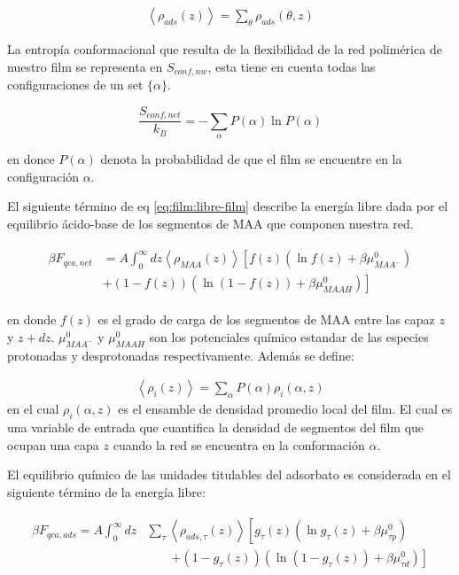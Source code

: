 \begin{align}
	\left<\rho_{ads}(z)\right> = \sum_\theta{\rho_{ads}(\theta,z)}
\end{align}


La entrop\'ia conformacional que resulta de la flexibilidad de la red polim\'erica de nuestro film se representa en $S_{conf, nw}$, esta tiene en cuenta todas las configuraciones de un set $\{\alpha\}$.

\begin{equation}
	\frac{S_{conf,net}}{k_B} = - \sum_{\alpha}{P(\alpha)\ln P(\alpha)}
\end{equation}

\noindent en donce $P(\alpha)$ denota la probabilidad de que el film se encuentre en la configuraci\'on $\alpha$.

El siguiente t\'ermino de eq \ref{eq:film:libre-film} describe  la energ\'ia libre dada por  el equilibrio \'acido-base de los segmentos de MAA que componen nuestra red. 

\begin{align}
	\begin{aligned}
		\beta F_{qca,net} &= A\int_0^\infty dz \left<\rho_{MAA}(z)\right> \left[f(z)(\ln f(z)+ \beta\mu^0_{MAA^-})\right.\\
		&\left.+(1-f(z))(\ln (1-f(z))+\beta\mu^0_{MAAH})\right]    
	\end{aligned}
\end{align} 

\noindent en donde $f(z)$ es el grado de carga de los segmentos de MAA entre las capaz $z$ y $z + dz$. 
$\mu^0_{MAA^-}$ y $\mu^0_{MAAH}$ son los potenciales qu\'imico estandar  de las especies protonadas y desprotonadas respectivamente.
Adem\'as se define:

\begin{align}
	\left< \rho_i(z)\right> = \sum_\alpha{P(\alpha)\rho_i(\alpha,z)}
\end{align}
\noindent en el cual $\rho_i(\alpha,z)$  es el ensamble de densidad  promedio local del film. El cual es una variable de entrada que cuantifica la densidad de segmentos del film que  ocupan una capa $z$ cuando la red se encuentra en la conformaci\'on $\alpha$.


El equilibrio qu\'imico de las unidades titulables del adsorbato  es considerada en el siguiente t\'ermino de la energ\'ia libre:

\begin{align}
	\begin{aligned}
		\beta F_{qca,ads} = A\int_0^\infty dz& \sum_\tau \left<\rho_{ads,\tau}(z)\right> \left[g_\tau(z)(\ln g_\tau(z)+ \beta\mu^0_{\tau p})\right.\\
		&\qquad\left.+(1-g_\tau(z))(\ln (1-g_\tau(z))+\beta\mu^0_{\tau d})\right]   
	\end{aligned}
\end{align} 

